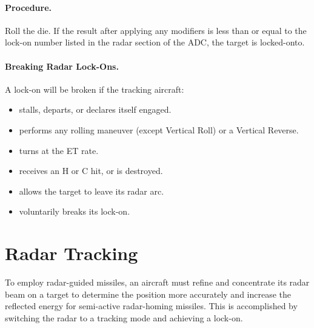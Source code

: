 {\paragraph{Procedure.} Roll the die. If the result after applying any modifiers is less than or equal to the lock-on number listed in the radar section of the ADC, the target is locked-onto. 

\paragraph{Breaking Radar Lock-Ons.} A lock-on will be broken if the tracking aircraft:

\begin{itemize}

    \item stalls, departs, or declares itself engaged.

    \item performs any rolling maneuver (except Vertical Roll) or a Vertical Reverse.

    \item turns at the ET rate.

    \item receives an H or C hit, or is destroyed.

    \item allows the target to leave its radar arc.

    \item voluntarily breaks its lock-on.

\end{itemize}

}{
\section{Radar Tracking}
\label{rule:radar-tracking-and-lock-ons}

To employ radar-guided missiles, an aircraft must refine and concentrate its radar beam on a target to determine the position more accurately and increase the reflected energy for semi-active radar-homing missiles. This is accomplished by switching the radar to a tracking mode and achieving a lock-on.

}
